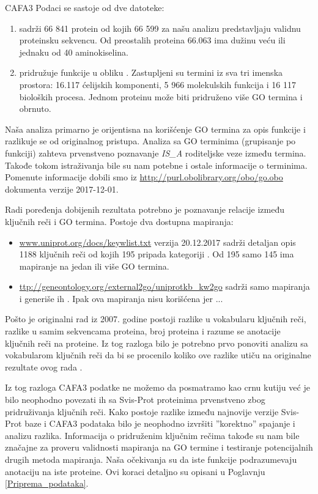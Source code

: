 CAFA3 Podaci se sastoje od dve datoteke:
\begin{enumerate}
  \item {}  sadrži 66 841 protein od kojih 66 599
    za našu analizu predstavljaju validnu proteinsku sekvencu. Od preostalih
    proteina 66.063 ima dužinu veću ili jednaku od 40 aminokiselina.
  \item {} pridružuje funkcije u obliku 
    . Zastupljeni su termini iz sva tri imenska prostora:
    16.117 ćelijskih komponenti, 5 966 molekulskih funkcija i 16 117 bioloških
    procesa. Jednom proteinu može biti pridruženo više GO termina i obrnuto.
\end{enumerate}

Naša analiza primarno je orijentisna na korišćenje GO termina za opis funkcije
i razlikuje se od originalnog pristupa.  Analiza sa GO terminima (grupisanje po
funkciji) zahteva prvenstveno poznavanje \textit{IS\_A} roditeljske veze između
termina. Takođe tokom istraživanja bile su nam potebne i ostale informacije o
terminima. Pomenute informacije dobili smo iz
\url{http://purl.obolibrary.org/obo/go.obo} dokumenta verzije 2017-12-01.

Radi poređenja dobijenih rezultata potrebno je poznavanje relacije između
ključnih reči i GO termina. Postoje dva dostupna mapiranja:
\begin{itemize}
  \item \url{www.uniprot.org/docs/keywlist.txt} verzija 20.12.2017 sadrži
    detaljan opis 1188 ključnih reči od kojih 195 pripada kategoriji
    .  Od 195 samo 145 ima mapiranje na jedan ili
    više GO termina.
  \item \url{ttp://geneontology.org/external2go/uniprotkb_kw2go} sadrži samo
    mapiranja i generiše ih  \parencite{Barrell2009}.
    Ipak ova mapiranja nisu korišćena jer ... 
\end{itemize}

Pošto je originalni rad \parencite{Xie2007} iz 2007. godine postoji razlike u
vokabularu ključnih reči, razlike u samim sekvencama proteina, broj proteina i
razume se anotacije ključnih reči na proteine.  Iz tog razloga bilo je potrebno
prvo ponoviti analizu sa vokabularom ključnih reči da bi se procenilo koliko
ove razlike utiču na originalne rezultate ovog rada \parencite{Xie2007}.

Iz tog razloga CAFA3 podatke ne možemo da posmatramo kao crnu kutiju već je
bilo neophodno povezati ih sa Svis-Prot proteinima prvenstveno zbog
pridruživanja ključnih reči. Kako postoje razlike između najnovije verzije Svis-Prot
baze i CAFA3 podataka bilo je neophodno izvršiti ''korektno'' spajanje i
analizu razlika.  Informacija o pridruženim ključnim rečima takođe su nam bile
značajne za proveru validnosti mapiranja na GO termine i testiranje
potencijalnih drugih metoda mapiranja. Naša očekivanja su da iste funkcije
podrazumevaju anotaciju na iste proteine.  Ovi koraci detaljno su opisani u
Poglavnju \ref{Priprema_podataka}.



